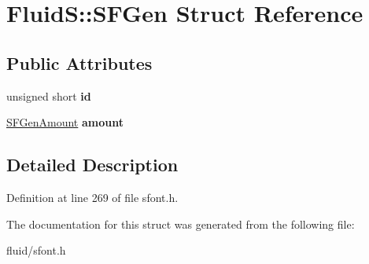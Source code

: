 \hypertarget{struct_fluid_s_1_1_s_f_gen}{}\section{FluidS\+:\+:S\+F\+Gen Struct Reference}
\label{struct_fluid_s_1_1_s_f_gen}
\subsection*{Public Attributes}
\begin{DoxyCompactItemize}
\item 
\mbox{\label{struct_fluid_s_1_1_s_f_gen_ae1f1aef503fbf935205484966ba877ee}} 
unsigned short {\bfseries id}
\item 
\mbox{\label{struct_fluid_s_1_1_s_f_gen_a3fe852b1569e237a81beda14d5ec079f}} 
\hyperlink{union_fluid_s_1_1_s_f_gen_amount}{S\+F\+Gen\+Amount} {\bfseries amount}
\end{DoxyCompactItemize}


\subsection{Detailed Description}


Definition at line 269 of file sfont.\+h.



The documentation for this struct was generated from the following file\+:\begin{DoxyCompactItemize}
\item 
fluid/sfont.\+h\end{DoxyCompactItemize}
